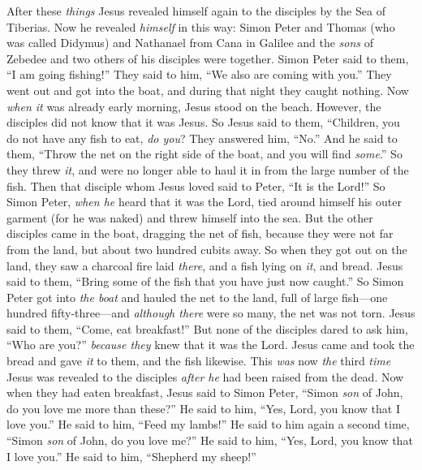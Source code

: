 \begin{biblechapter} %
 After these \textit{things} Jesus revealed himself again to the disciples by the Sea of Tiberias. Now he revealed \textit{himself} in this way:
\verse Simon Peter and Thomas (who was called Didymus) and Nathanael from Cana in Galilee and the \textit{sons} of Zebedee and two others of his disciples were together.
\verse Simon Peter said to them, “I am going fishing!” They said to him, “We also are coming with you.” They went out and got into the boat, and during that night they caught nothing.
\verse Now \textit{when it} was already early morning, Jesus stood on the beach. However, the disciples did not know that it was Jesus.
\verse So Jesus said to them, “Children, you do not have any fish to eat, \textit{do you}? They answered him, “No.”
\verse And he said to them, “Throw the net on the right side of the boat, and you will find \textit{some}.” So they threw \textit{it}, and were no longer able to haul it in from the large number of the fish.
\verse Then that disciple whom Jesus loved said to Peter, “It is the Lord!” So Simon Peter, \textit{when he} heard that it was the Lord, tied around himself his outer garment (for he was naked) and threw himself into the sea.
\verse But the other disciples came in the boat, dragging the net of fish, because they were not far from the land, but about two hundred cubits away.
\verse So when they got out on the land, they saw a charcoal fire laid \textit{there}, and a fish lying on \textit{it}, and bread.
\verse Jesus said to them, “Bring some of the fish that you have just now caught.”
\verse So Simon Peter got into \textit{the boat} and hauled the net to the land, full of large fish—one hundred fifty-three—and \textit{although there} were so many, the net was not torn.
\verse Jesus said to them, “Come, eat breakfast!” But none of the disciples dared to ask him, “Who are you?” \textit{because they} knew that it was the Lord.
\verse Jesus came and took the bread and gave \textit{it} to them, and the fish likewise.
\verse This \textit{was} now \textit{the} third \textit{time} Jesus was revealed to the disciples \textit{after he} had been raised from the dead.
 Now when they had eaten breakfast, Jesus said to Simon Peter, “Simon \textit{son} of John, do you love me more than these?” He said to him, “Yes, Lord, you know that I love you.” He said to him, “Feed my lambs!”
\verse He said to him again a second time, “Simon \textit{son} of John, do you love me?” He said to him, “Yes, Lord, you know that I love you.” He said to him, “Shepherd my sheep!”

\end{biblechapter}
